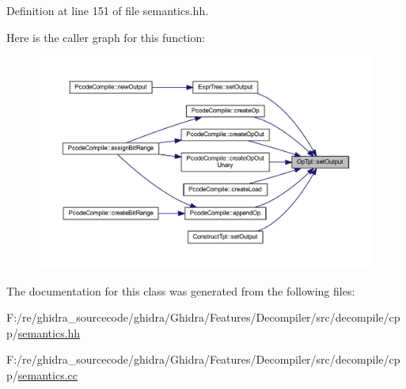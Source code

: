 Definition at line 151 of file semantics.\+hh.

Here is the caller graph for this function\+:
\nopagebreak
\begin{figure}[H]
\begin{center}
\leavevmode
\includegraphics[width=350pt]{class_op_tpl_a650e793602afb0b054b2270087276c70_icgraph}
\end{center}
\end{figure}


The documentation for this class was generated from the following files\+:\begin{DoxyCompactItemize}
\item 
F\+:/re/ghidra\+\_\+sourcecode/ghidra/\+Ghidra/\+Features/\+Decompiler/src/decompile/cpp/\mbox{\hyperlink{semantics_8hh}{semantics.\+hh}}\item 
F\+:/re/ghidra\+\_\+sourcecode/ghidra/\+Ghidra/\+Features/\+Decompiler/src/decompile/cpp/\mbox{\hyperlink{semantics_8cc}{semantics.\+cc}}\end{DoxyCompactItemize}
